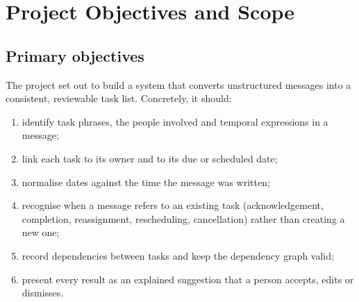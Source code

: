 \chapter{Project Objectives and Scope}
\label{ch:objectives}

\section{Primary objectives}
The project set out to build a system that converts unstructured messages into a consistent, reviewable task list. Concretely, it should:
\begin{enumerate}
  \item identify task phrases, the people involved and temporal expressions in a message;
  \item link each task to its owner and to its due or scheduled date;
  \item normalise dates against the time the message was written;
  \item recognise when a message refers to an existing task (acknowledgement, completion, reassignment, rescheduling, cancellation) rather than creating a new one;
  \item record dependencies between tasks and keep the dependency graph valid;
  \item present every result as an explained suggestion that a person accepts, edits or dismisses.
\end{enumerate}

